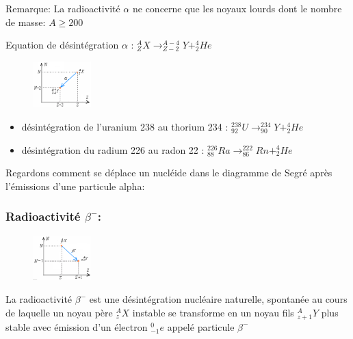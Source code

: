 \documentclass[12pt]{article}
\begin{document}
Remarque: La radioactivité $\alpha$ ne concerne que les noyaux lourds dont le nombre de masse: $A \geq 200$

Equation de désintégration $\alpha$ : $_Z^AX \rightarrow _{Z- 2 }^{A - 4}Y + _{2}^{4}He$

  \begin{figure}
	\vspace{-3cm}
	\includegraphics[width=0.2\textwidth]{./img/nuc04.png}
\end{figure}



\begin{itemize}
	\item désintégration de l'uranium 238 au thorium 234 : $_{92}^{238}U \rightarrow       _{90}^{234}Y + _{2}^{4}He$

	\item désintégration du radium 226 au radon 22 : $_{88}^{226}Ra \rightarrow            _{86}^{222}Rn + _{2}^{4}He$
\end{itemize}

Regardons comment se déplace un nucléide dans le diagramme de Segré après l'émissions d'une particule alpha:

\subsubsection{ Radioactivité $\beta^-$: }

  \begin{figure}
	\includegraphics[width=0.2\textwidth]{./img/nuc05.png}
\end{figure}


La radioactivité $\beta^-$ est une désintégration nucléaire naturelle, spontanée au cours de laquelle un noyau père  $_{z}^{A}X$ instable se transforme en un noyau fils            $_{z+1}^{A}Y$ plus stable avec émission d'un électron $_{-1}^{0}e$ appelé particule $\beta^-$
\end{document}

